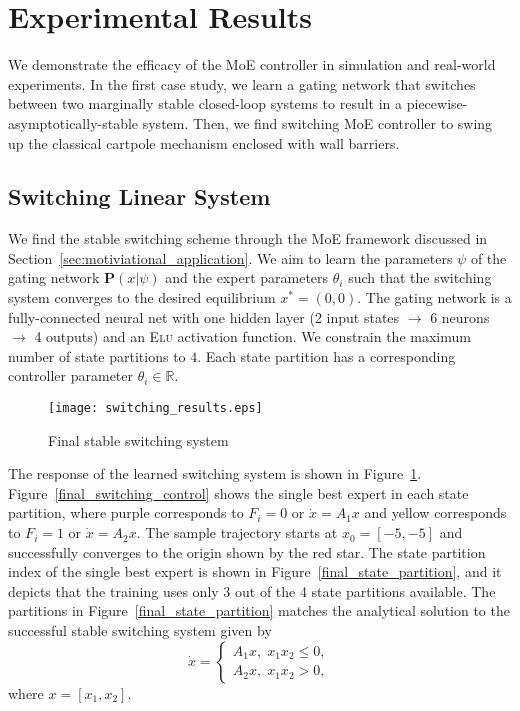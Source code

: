 \section{Experimental Results}
\label{sec:moe_results}

We demonstrate the efficacy of the MoE controller in simulation
and real-world experiments.
%
In the first case study, we learn a gating network that switches between two
marginally stable closed-loop systems to result in a
piecewise-asymptotically-stable system.
%
Then, we find switching MoE controller to swing up the classical cartpole
mechanism enclosed with wall barriers.
%

\subsection{Switching Linear System}

We find the stable switching scheme through the MoE framework discussed in
Section~\ref{sec:motiviational_application}.
%
We aim to learn the parameters $\psi$ of the gating network $\mathbf{P}(x|
\psi)$ and the expert parameters $\theta_i$ such that the switching system
converges to the desired equilibrium $x^* = (0, 0)$.
%
The gating network is a fully-connected neural net with one hidden layer (2 input states 
$\rightarrow$ 6 neurons $\rightarrow$ 4 outputs) and an \textsc{Elu} activation
function\cite{clevert2015fast}.
%
We constrain the maximum number of state partitions to $4$.
%
Each state partition has a corresponding controller parameter $\theta_i \in
\mathbb{R}$. 
%
\begin{figure}[tb]
    \centering
    \texttt{[image: switching\_results.eps]}
    \caption{Final stable switching system}
    \label{fig:final_switching}
\end{figure}

The response of the learned switching system is shown in
Figure~\ref{fig:final_switching}.
%
Figure~\ref{final_switching_control} shows the single best expert in each state
partition, where purple corresponds to $F_i=0$ or $\dot{x} = A_1x$ and yellow
corresponds to $F_i=1$ or $\dot{x} = A_2x$. The sample trajectory starts at $x_0=[-5,
-5]$ and successfully converges to the origin shown by the red star.
%
The state partition index of the single best expert is shown in
Figure~\ref{final_state_partition}, and it depicts that the training uses only 3
out of the 4 state partitions available.
%
The partitions in Figure~\ref{final_state_partition} matches the analytical
solution to the successful stable switching system given
by\cite{liberzon2003switching}
\begin{equation*}
    \dot{x} = \begin{cases}
        A_1x, \; x_1x_2 \leq 0, \\
        A_2x, \; x_1x_2 > 0,
    \end{cases}
\end{equation*}
\noindent where $x=[x_1, x_2]$.
%

